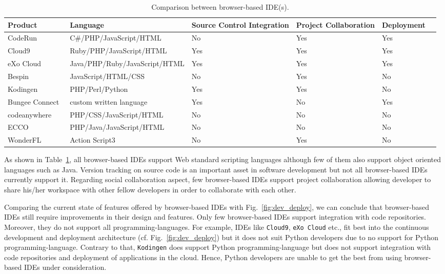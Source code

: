 \documentclass[11pt,fleqn,twoside]{article}
\begin{document}
\begin{table}[h]
\centering
\tiny {
\begin{tabular}{|p{2.3cm}|p{4.0cm}|p{2.5cm}|p{1.5cm}|p{1.5cm}|p{1.2cm}|}
\hline
\tiny \textbf{Product} & \tiny \textbf{Language} & \tiny \textbf{Source Control Integration} & \tiny \textbf{Project Collaboration} & \tiny \textbf{Deployment}\\
\hline
CodeRun~\cite{codeRun_url} & C\#/PHP/JavaScript/HTML & No & Yes & Yes \\
\hline
Cloud9 & Ruby/PHP/JavaScript/HTML & Yes & Yes & Yes \\
\hline
eXo Cloud & Java/PHP/Ruby/JavaScript/HTML & Yes & Yes & Yes \\
\hline
Bespin~\cite{bespin_url} & JavaScript/HTML/CSS & No & Yes & No \\
\hline
Kodingen~\cite{kodingen_url} & PHP/Perl/Python & Yes & Yes & No \\
\hline
Bungee Connect~\cite{bungee_url} & custom written language & Yes & No & Yes \\
\hline
codeanywhere~\cite{codeanywhere_url} & PHP/CSS/JavaScript/HTML & No & No & No \\
\hline
ECCO~\cite{ecco_url} & PHP/Java/JavaScript/HTML & No & No & No \\
\hline
WonderFL~\cite{wonderfl_url} & Action Script3 & No & Yes & No \\
\hline
\end{tabular}
}
\caption{Comparison between browser-based IDE(s).}
\label{DaaS_comparison}
\end{table}

As shown in Table~\ref{DaaS_comparison}, all browser-based IDEs support Web standard scripting languages although few of them also support object oriented languages such as Java. Version tracking on source code is an important asset in software development but not all browser-based IDEs currently support it. Regarding social collaboration aspect, few browser-based IDEs support project collaboration allowing developer to share his/her workspace with other fellow developers in order to collaborate with each other.

Comparing the current state of features offered by browser-based IDEs with Fig.~\ref{fig:dev_deploy}, we can conclude that browser-based IDEs still require improvements in their design and features. Only few browser-based IDEs support integration with code repositories. Moreover, they do not support all programming-languages. For example, IDEs like \texttt{Cloud9}, \texttt{eXo Cloud} etc., fit best into the continuous development and deployment architecture (cf. Fig.~\ref{fig:dev_deploy}) but it does not suit Python developers due to no support for Python programming-language. Contrary to that, \texttt{Kodingen} does support Python programming-language but does not support integration with code repositories and deployment of applications in the cloud. Hence, Python developers are unable to get the best from using browser-based IDEs under consideration.
\end{document}
